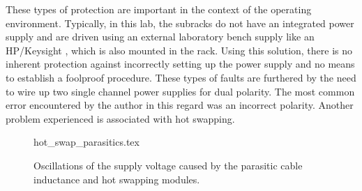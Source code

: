These types of protection are important in the context of the operating environment. Typically, in this lab, the subracks do not have an integrated power supply and are driven using an external laboratory bench supply like an HP/Keysight  \cite{datasheet_keysight6632B}, which is also mounted in the rack. Using this solution, there is no inherent protection against incorrectly setting up the power supply and no means to establish a foolproof procedure. These types of faults are furthered by the need to wire up two single channel power supplies for dual polarity. The most common error encountered by the author in this regard was an incorrect polarity. Another problem experienced is associated with hot swapping.
\begin{figure}[ht]
    \centering
    \begin{subcaptionblock}{0.45\linewidth}
        \begin{minipage}[t][4.4cm]{\linewidth}
            \centering
            {hot_swap_parasitics.tex}
        \end{minipage}
        \caption{Power supply input parasitic elements forming an underdamped oscillator.}
        \label{fig:hot_swap_parasitics}
    \end{subcaptionblock}
    \begin{subcaptionblock}{0.45\linewidth}
        \centering
            
        \caption{Simulated connection to a hot \qty{15}{\V} rail. The parameters were $L=\qty{3}{\uH}$, $R=\qty{10}{\milli\ohm}$ and $C=\qty{1}{\uF}$.}
        \label{fig:hot_swap_simulation}
    \end{subcaptionblock}
    \caption{Oscillations of the supply voltage caused by the parasitic cable inductance and hot swapping modules.}
    \label{fig:hot_swap_example}
\end{figure}

